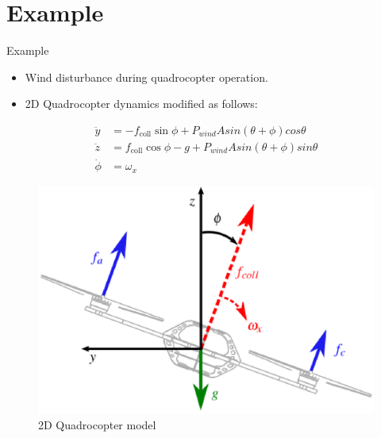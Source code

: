 \documentclass[handout]{beamer}
\begin{document}
\section{Example}
\begin{frame}{Example}
\begin{itemize}
\item Wind disturbance during quadrocopter operation. \pause
\item 2D Quadrocopter dynamics modified as follows: \pause
\end{itemize}
\begin{equation}
\begin{aligned}
\ddot{y} &= -f_{\mathrm{coll}} \sin\phi + P_{wind} A sin(\theta + \phi) cos \theta \\
\ddot{z} &=  f_{\mathrm{coll}}\cos\phi - g + P_{wind} A sin(\theta + \phi) sin \theta \\
\dot{\phi} &= \omega_{x}
\end{aligned}
\end{equation}
\begin{figure}
\center
\includegraphics[scale=0.25]{quadrocopter}			
\caption{2D Quadrocopter model}
\end{figure}
\end{frame}
%
\end{document}
